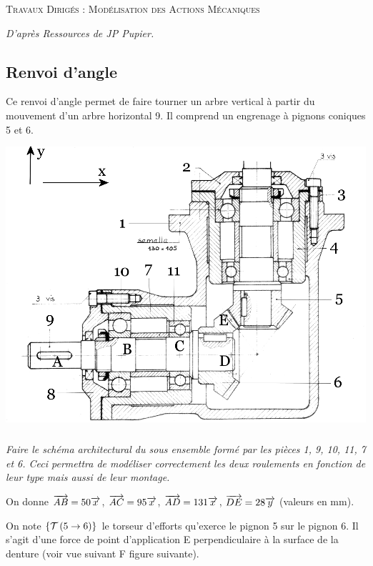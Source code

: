 \documentclass[10pt]{article}
\begin{document}

\begin{center}
\Large{\textsc{Travaux Dirigés : Modélisation des Actions Mécaniques}}
\end{center}
\begin{flushright}
\textit{D'après Ressources de JP Pupier.}
\end{flushright}
\vspace{.5cm}



\subsection*{Renvoi d'angle}

Ce renvoi d'angle permet de faire tourner un arbre vertical à partir du mouvement d'un arbre horizontal 9. Il comprend un engrenage à pignons coniques 5 et 6.


\begin{center}
\includegraphics[width=.9\textwidth]{images/fig_01}
\end{center}



\subparagraph{}
\textit{Faire le schéma architectural du sous ensemble formé par les pièces 1, 9, 10, 11, 7 et 6. Ceci permettra de modéliser correctement les deux roulements en fonction de leur type mais aussi de leur montage.}

On donne $\overrightarrow{AB}=50\overrightarrow{x}$, $\overrightarrow{AC}=95\overrightarrow{x}$, $\overrightarrow{AD}=131\overrightarrow{x}$, $\overrightarrow{DE}=28\overrightarrow{y}$ (valeurs en mm). 

On note $\left\{\mathcal{T} \left(5\rightarrow 6 \right) \right\}$ le torseur d'efforts qu'exerce le pignon 5 sur le pignon 6. Il s'agit d'une force de point d'application E perpendiculaire à la surface de la denture (voir vue suivant F figure suivante).
\end{document}

